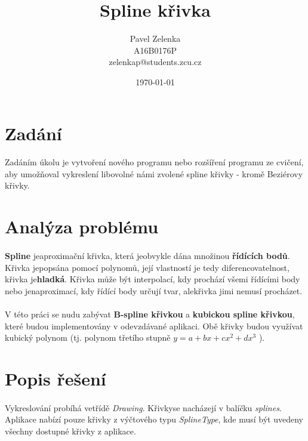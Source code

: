 \documentclass[12pt]{scrartcl}
\author{Pavel Zelenka\\A16B0176P\\zelenkap@students.zcu.cz}
\date{\today}
\title{Spline křivka}
\begin{document}
\maketitle
{}
\newpage
{}
\newpage
\section{Zadání}
	
\paragraph{}
Zadáním úkolu je vytvoření nového programu nebo rozšíření programu ze cvičení, aby umožňoval vykreslení libovolné námi zvolené spline křivky - kromě Beziérovy křivky.

\section{Analýza problému}

\paragraph{}
\textbf{Spline} je\nobreakspace aproximační křivka, která je\nobreakspace obvykle dána množinou \textbf{řídících bodů}. Křivka je\nobreakspace popsána pomocí polynomů, její vlastností je tedy diferencovatelnost, křivka je\nobreakspace \textbf{hladká}. Křivka může být interpolací, kdy prochází všemi řídícími body nebo jen\nobreakspace aproximací, kdy řídící body určují tvar, ale\nobreakspace křivka jimi nemusí procházet.

\paragraph{}
V této práci se nudu zabývat \textbf{B-spline křivkou} a \textbf{kubickou spline křivkou}, které budou implementovány v odevzdávané aplikaci. Obě křivky budou využívat kubický polynom (tj. polynom třetího stupně $y = a + bx + cx^2 + dx^3$ ).


\section{Popis řešení}

\paragraph{}
Vykreslování probíhá ve\nobreakspace třídě \emph{Drawing}. Křivky\nobreakspace  se nacházejí v balíčku \emph{splines}. Aplikace nabízí pouze křivky z výčtového typu \emph{SplineType}, kde musí být uvedeny všechny dostupné křivky z aplikace.\\
\end{document}
